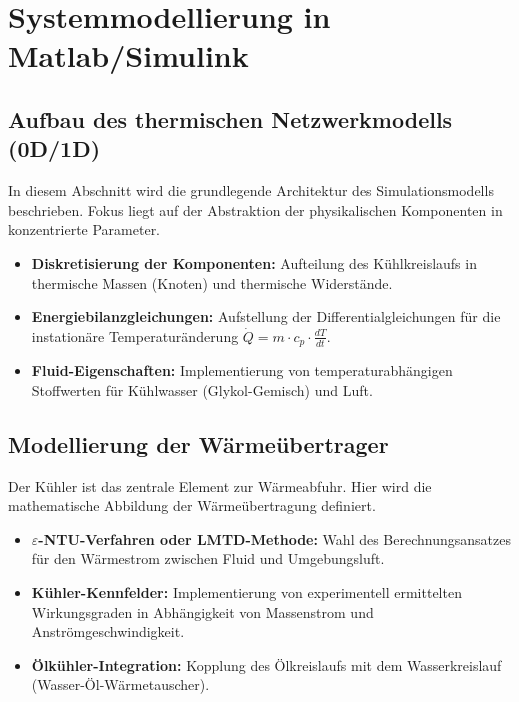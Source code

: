 \section{Systemmodellierung in Matlab/Simulink}

\subsection{Aufbau des thermischen Netzwerkmodells (0D/1D)}
In diesem Abschnitt wird die grundlegende Architektur des Simulationsmodells beschrieben. Fokus liegt auf der Abstraktion der physikalischen Komponenten in konzentrierte Parameter.
\begin{itemize}
    \item \textbf{Diskretisierung der Komponenten:} Aufteilung des Kühlkreislaufs in thermische Massen (Knoten) und thermische Widerstände.
    \item \textbf{Energiebilanzgleichungen:} Aufstellung der Differentialgleichungen für die instationäre Temperaturänderung $\dot{Q} = m \cdot c_p \cdot \frac{dT}{dt}$.
    \item \textbf{Fluid-Eigenschaften:} Implementierung von temperaturabhängigen Stoffwerten für Kühlwasser (Glykol-Gemisch) und Luft.
\end{itemize}

\subsection{Modellierung der Wärmeübertrager}
Der Kühler ist das zentrale Element zur Wärmeabfuhr. Hier wird die mathematische Abbildung der Wärmeübertragung definiert.
\begin{itemize}
    \item \textbf{$\varepsilon$-NTU-Verfahren oder LMTD-Methode:} Wahl des Berechnungsansatzes für den Wärmestrom zwischen Fluid und Umgebungsluft.
    \item \textbf{Kühler-Kennfelder:} Implementierung von experimentell ermittelten Wirkungsgraden in Abhängigkeit von Massenstrom und Anströmgeschwindigkeit.
    \item \textbf{Ölkühler-Integration:} Kopplung des Ölkreislaufs mit dem Wasserkreislauf (Wasser-Öl-Wärmetauscher).
\end{itemize}

